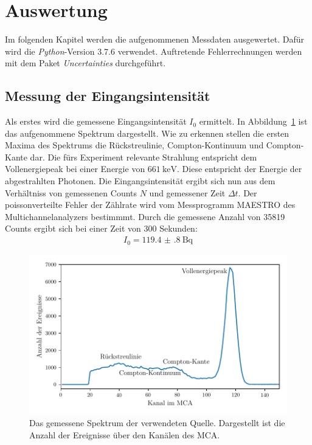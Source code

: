 \section{Auswertung}
\label{sec:Auswertung}

Im folgenden Kapitel werden die aufgenommenen Messdaten ausgewertet. Daf\"ur wird die \textit{Python}-Version 3.7.6 verwendet. Auftretende Fehlerrechnungen werden mit dem Paket \textit{Uncertainties} durchgef\"uhrt.

\subsection{Messung der Eingangsintensit\"at}

Als erstes wird die gemessene Eingangsintensit\"at $I_0$ ermittelt. In Abbildung~\ref{fig:spektrum} ist das aufgenommene Spektrum dargestellt. Wie zu erkennen stellen die ersten Maxima des Spektrums die
R\"uckstreulinie, Compton-Kontinuum und Compton-Kante dar. Die f\"urs Experiment relevante Strahlung entspricht dem Vollenergiepeak bei einer Energie von $\SI{661}{\kilo\electronvolt}$. Diese entspricht der Energie der
abgestrahlten Photonen. Die Eingangsintensit\"at ergibt sich nun aus dem Verh\"altniss von gemessenen Counts $N$ und gemessener Zeit $\Delta t$. Der poissonverteilte Fehler der Z\"ahlrate wird vom Messprogramm
MAESTRO des Multichannelanalyzers bestimmmt. Durch die gemessene Anzahl von 35819 Counts ergibt sich bei einer Zeit von 300 Sekunden:
\begin{align*}
  I_0 = \SI{119.4(8)}{\becquerel}
\end{align*}

\begin{figure}
    \centering
    \includegraphics{spektrum.pdf}
    \caption{Das gemessene Spektrum der verwendeten Quelle. Dargestellt ist die Anzahl der Ereignisse \"uber den Kan\"alen des MCA.}
    \label{fig:spektrum}
\end{figure}


